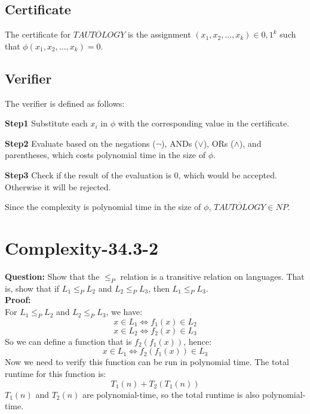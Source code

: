 \documentclass[12pt]{article}
\begin{document}
 


\subsection{Certificate}
The certificate for $\overline{TAUTOLOGY}$ is the assignment $(x_1,x_2,...,x_k) \in {0,1}^k$ such that $\phi(x_1,x_2,...,x_k) = 0$.

\subsection{Verifier}
The verifier is defined as follows:

\textbf{Step1} Substitute each $x_i$ in $\phi$ with the corresponding value in the certificate.

\textbf{Step2} Evaluate based on the negations ($\neg$), ANDs ($\vee$), ORs ($\wedge$), and parentheses, which costs polynomial time in the size of $\phi$.

\textbf{Step3} Check if the result of the evaluation is 0, which would be accepted. Otherwise it will be rejected. 

Since the complexity is polynomial time in the size of $\phi$, $\overline{TAUTOLOGY} \in NP$.

\section{Complexity-34.3-2}
\textbf{Question:} Show that the \(\leq_P\) relation is a transitive relation on languages. That is, show that if \(L_1 \leq_PL_2 \) and \(L_2\leq_P L_3\), then \(L_1\leq_P L_3\). \\
\textbf{Proof:}\\
For \(L_1 \leq_PL_2 \) and \(L_2\leq_P L_3\), we have:
\[x \in L_1 \iff f_1(x) \in L_2\]
\[x \in L_2 \iff f_2(x) \in L_3\]
So we can define a function that is \(f_2(f_1(x))\), hence:
\[x \in L_1 \iff f_2(f_1(x)) \in L_3\]
Now we need to verify this function can be run in polynomial time.
The total runtime for this function is:
\[T_1(n)+T_2(T_1(n))\]
\(T_1(n)\) and \(T_2(n)\) are polynomial-time, so the total runtime is also polynomial-time.
\end{document}
